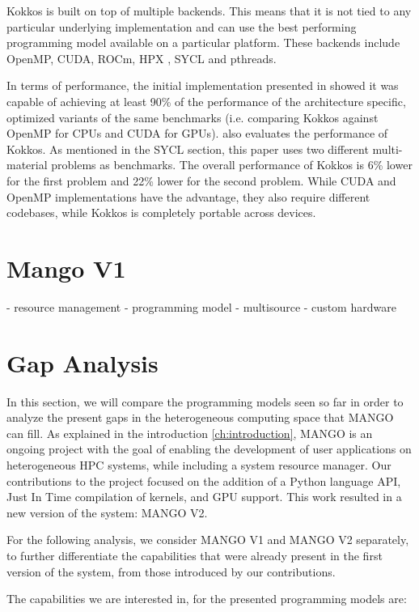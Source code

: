 Kokkos is built on top of multiple backends. This means that it is not tied to any particular underlying implementation and can use the best performing programming model available on a particular platform. These backends include OpenMP, CUDA, ROCm, HPX \cite{hpx}, SYCL and pthreads.

In terms of performance, the initial implementation presented in \cite{kokkos} showed it was capable of achieving at least 90\% of the performance of the architecture specific, optimized variants of the same benchmarks (i.e. comparing Kokkos against OpenMP for CPUs and CUDA for GPUs). \cite{performance_portability_multimaterial_kernels} also evaluates the performance of Kokkos. As mentioned in the SYCL section, this paper uses two different multi-material problems as benchmarks. The overall performance of Kokkos is 6\% lower for the first problem and 22\% lower for the second problem. While CUDA and OpenMP implementations have the advantage, they also require different codebases, while Kokkos is completely portable across devices.


\section{Mango V1} \label{sect:mangov1}
- resource management
- programming model
- multisource
- custom hardware

\section{Gap Analysis}

In this section, we will compare the programming models seen so far in order to analyze the present gaps in the heterogeneous computing space that MANGO can fill.
As explained in the introduction \ref{ch:introduction}, MANGO is an ongoing project with the goal of enabling the development of user applications on heterogeneous HPC systems, while including a system resource manager. 
Our contributions to the project focused on the addition of a Python language API, Just In Time compilation of kernels, and GPU support.
This work resulted in a new version of the system: MANGO V2.

For the following analysis, we consider MANGO V1 and MANGO V2 separately, to further differentiate the capabilities that were already present in the first version of the system, from those introduced by our contributions.

The capabilities we are interested in, for the presented programming models are:

